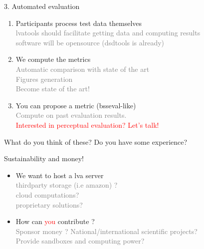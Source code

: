 \documentclass{beamer}
\begin{document}
\begin{frame}{3. Automated evaluation}
\begin{enumerate}
\item Participants process test data themselves\\
\textcolor{gray}{lvatools should facilitate getting data and computing results\\software will be opensource (dsdtools is already)}
\item We compute the metrics\\
\textcolor{gray}{Automatic comparison with state of the art\\Figures generation\\Become state of the art!}
\item You can propose a metric (bsseval-like)\\
\textcolor{gray}{Compute on past evaluation results. }\\
\textcolor{red}{Interested in perceptual evaluation? Let's talk!}
\end{enumerate}

\vspace{0.5cm}What do you think of these? Do you have some experience?
\end{frame}

\begin{frame}{Sustainability and money!}


  \begin{itemize}

\item We want to host a lva server\\
\textcolor{gray}{thirdparty storage (i.e amazon) ?\\cloud computations?\\proprietary solutions?}\\
\item How can \textcolor{red}{you} contribute ?\\
\textcolor{gray}{Sponsor money ? National/international scientific projects?\\Provide sandboxes and computing power?}

\end{itemize}


\end{frame}







\end{document}
